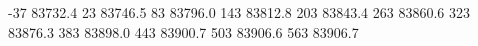 -37 83732.4
23 83746.5
83 83796.0
143 83812.8
203 83843.4
263 83860.6
323 83876.3
383 83898.0
443 83900.7
503 83906.6
563 83906.7
